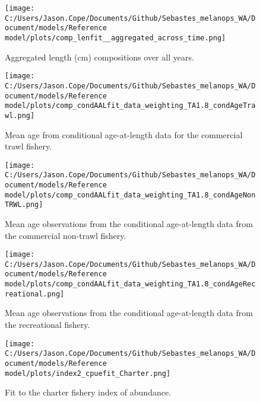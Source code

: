 \documentclass[11pt,
  english,
  letterpaper,
]{article}
\begin{document}
\pagebreak

\begin{figure}
\centering
\texttt{[image: C:/Users/Jason.Cope/Documents/Github/Sebastes\_melanops\_WA/Document/models/Reference model/plots/comp\_lenfit\_\_aggregated\_across\_time.png]}
\caption{Aggregated length (cm) compositions over all years.\label{fig:agg-len-fit}}
\end{figure}

\pagebreak

\begin{figure}
\centering
\texttt{[image: C:/Users/Jason.Cope/Documents/Github/Sebastes\_melanops\_WA/Document/models/Reference model/plots/comp\_condAALfit\_data\_weighting\_TA1.8\_condAgeTrawl.png]}
\caption{Mean age from conditional age-at-length data for the commercial trawl fishery.\label{fig:trawl-mean-caal}}
\end{figure}

\pagebreak

\begin{figure}
\centering
\texttt{[image: C:/Users/Jason.Cope/Documents/Github/Sebastes\_melanops\_WA/Document/models/Reference model/plots/comp\_condAALfit\_data\_weighting\_TA1.8\_condAgeNonTRWL.png]}
\caption{Mean age observations from the conditional age-at-length data from the commercial non-trawl fishery.\label{fig:nontrawl-mean-caal}}
\end{figure}

\pagebreak

\begin{figure}
\centering
\texttt{[image: C:/Users/Jason.Cope/Documents/Github/Sebastes\_melanops\_WA/Document/models/Reference model/plots/comp\_condAALfit\_data\_weighting\_TA1.8\_condAgeRecreational.png]}
\caption{Mean age observations from the conditional age-at-length data from the recreational fishery.\label{fig:rec-mean-caal}}
\end{figure}

\pagebreak

\begin{figure}
\centering
\texttt{[image: C:/Users/Jason.Cope/Documents/Github/Sebastes\_melanops\_WA/Document/models/Reference model/plots/index2\_cpuefit\_Charter.png]}
\caption{Fit to the charter fishery index of abundance.\label{fig:charter-index-fit}}
\end{figure}
\end{document}
